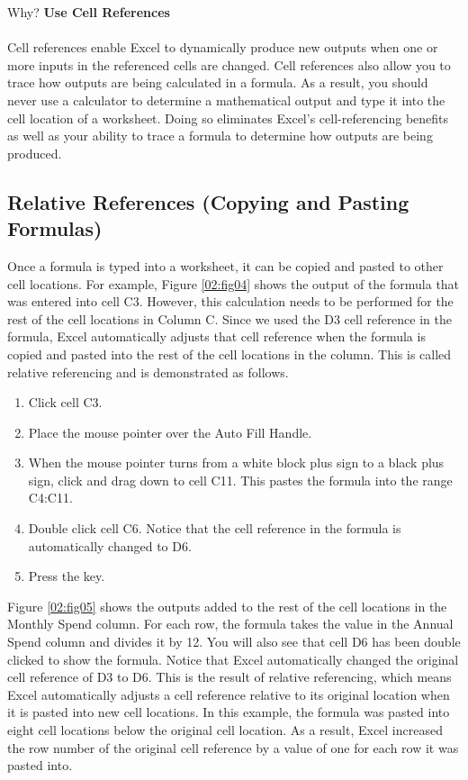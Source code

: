 \begin{center}
	\begin{infobox}{Why?}
		\textbf{Use Cell References}
		\\
		\\
		Cell references enable Excel to dynamically produce new outputs when one or more inputs in the referenced cells are changed. Cell references also allow you to trace how outputs are being calculated in a formula. As a result, you should never use a calculator to determine a mathematical output and type it into the cell location of a worksheet. Doing so eliminates Excel's cell-referencing benefits as well as your ability to trace a formula to determine how outputs are being produced.
	\end{infobox}
\end{center}

\subsection{Relative References (Copying and Pasting Formulas)}

Once a formula is typed into a worksheet, it can be copied and pasted to other cell locations. For example, Figure \ref{02:fig04} shows the output of the formula that was entered into cell \textsf{C3}. However, this calculation needs to be performed for the rest of the cell locations in Column \textsf{C}. Since we used the \textsf{D3} cell reference in the formula, Excel automatically adjusts that cell reference when the formula is copied and pasted into the rest of the cell locations in the column. This is called relative referencing and is demonstrated as follows.

\begin{enumerate}
	\item Click cell \textsf{C3}.
	\item Place the mouse pointer over the Auto Fill Handle.
	\item When the mouse pointer turns from a white block plus sign to a black plus sign, click and drag down to cell \textsf{C11}. This pastes the formula into the range \textsf{C4:C11}.
	\item Double click cell \textsf{C6}. Notice that the cell reference in the formula is automatically changed to \textsf{D6}.
	\item Press the  key.
\end{enumerate}

Figure \ref{02:fig05} shows the outputs added to the rest of the cell locations in the Monthly Spend column. For each row, the formula takes the value in the Annual Spend column and divides it by 12. You will also see that cell \textsf{D6} has been double clicked to show the formula. Notice that Excel automatically changed the original cell reference of \textsf{D3} to \textsf{D6}. This is the result of relative referencing, which means Excel automatically adjusts a cell reference relative to its original location when it is pasted into new cell locations. In this example, the formula was pasted into eight cell locations below the original cell location. As a result, Excel increased the row number of the original cell reference by a value of one for each row it was pasted into.


